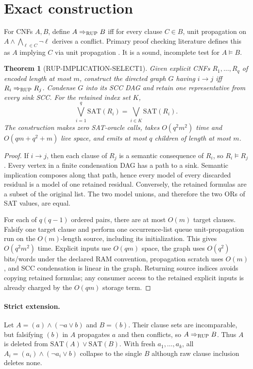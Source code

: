 \documentclass[11pt]{article}
\newtheorem{theorem}{Theorem}
\newcommand{\SAT}{\mathrm{SAT}}
\begin{document}
\section*{Exact construction}
For CNFs $A,B$, define $A\Rightarrow_{\rm RUP}B$ iff for every clause
$C\in B$, unit propagation on
$A\wedge\bigwedge_{\ell\in C}\neg\ell$ derives a conflict.  Primary proof
checking literature defines this as $A$ implying $C$ via unit propagation
\cite{wetzler2014drat,reeves2023pr}.  It is a sound, incomplete test for
$A\models B$.

\begin{theorem}[RUP-IMPLICATION-SELECT1]
Given explicit CNFs $R_1,\ldots,R_q$ of encoded length at most $m$, construct
the directed graph $G$ having $i\to j$ iff
$R_i\Rightarrow_{\rm RUP}R_j$.  Condense $G$ into its SCC DAG and retain one
representative from every sink SCC.  For the retained index set $K$,
\[
 \bigvee_{i=1}^{q}\SAT(R_i)=\bigvee_{i\in K}\SAT(R_i).
\]
The construction makes zero SAT-oracle calls, takes $O(q^2m^2)$ time and
$O(qm+q^2+m)$ live space, and emits at most $q$ children of length at most
$m$.
\end{theorem}
\begin{proof}
If $i\to j$, then each clause of $R_j$ is a semantic consequence of $R_i$,
so $R_i\models R_j$.  Every vertex in a finite condensation DAG has a path to
a sink.  Semantic implication composes along that path, hence every model of
every discarded residual is a model of one retained residual.  Conversely,
the retained formulas are a subset of the original list.  The two model
unions, and therefore the two ORs of SAT values, are equal.

For each of $q(q-1)$ ordered pairs, there are at most $O(m)$ target clauses.
Falsify one target clause and perform one occurrence-list queue
unit-propagation run on the $O(m)$-length source, including its initialization.
This gives
$O(q^2m^2)$ time.  Explicit inputs use $O(qm)$ space, the graph uses
$O(q^2)$ bits/words under the declared RAM convention, propagation scratch
uses $O(m)$, and SCC condensation is linear in the graph.  Returning source
indices avoids copying retained formulas; any consumer access to the retained
explicit inputs is already charged by the $O(qm)$ storage term.
\end{proof}

\paragraph{Strict extension.}
Let $A=(a)\wedge(\neg a\vee b)$ and $B=(b)$.  Their clause sets are
incomparable, but falsifying $(b)$ in $A$ propagates $a$ and then conflicts,
so $A\Rightarrow_{\rm RUP}B$.  Thus $A$ is deleted from
$\SAT(A)\vee\SAT(B)$.  With fresh $a_1,\ldots,a_k$, all
$A_i=(a_i)\wedge(\neg a_i\vee b)$ collapse to the single $B$ although raw
clause inclusion deletes none.
\end{document}
